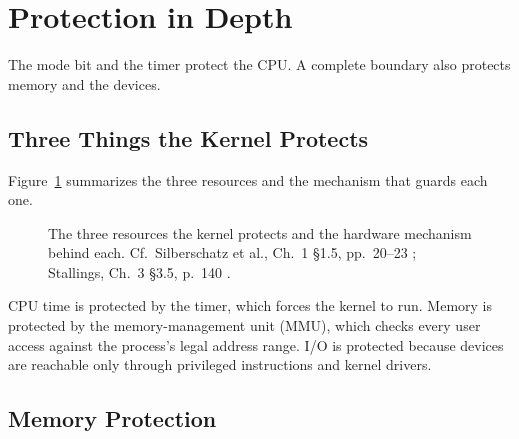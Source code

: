 \documentclass[11pt]{article}
\begin{document}
\section{Protection in Depth}
\noindent{}

The mode bit and the timer protect the CPU. A complete boundary also protects
memory and the devices.

\subsection{Three Things the Kernel Protects}

Figure~\ref{fig:three-things} summarizes the three resources and the mechanism
that guards each one.

\begin{figure}[h]
  \centering
  \caption{The three resources the kernel protects and the hardware mechanism
  behind each. Cf.\ Silberschatz et al., Ch.~1 \S1.5, pp.~20--23
  \cite{SilberschatzOSC_operating_system_concepts}; Stallings, Ch.~3 \S3.5,
  p.~140 \cite{StallingsOS_internals_design_principles}.}
  \label{fig:three-things}
\end{figure}

CPU time is protected by the timer, which forces the kernel to run. Memory is
protected by the memory-management unit (MMU), which checks every user access
against the process's legal address range. I/O is protected because devices are
reachable only through privileged instructions and kernel drivers.

\subsection{Memory Protection}
\end{document}

